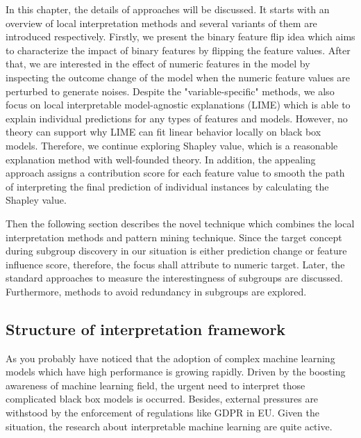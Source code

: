 In this chapter, the details of approaches will be discussed. It starts with an overview of local interpretation methods and several variants of them are introduced respectively. Firstly, we present the binary feature flip idea which aims to characterize the impact of binary features by flipping the feature values. After that, we are interested in the effect of numeric features in the model by inspecting the outcome change of the model when the numeric feature values are perturbed to generate noises. Despite the "variable-specific" methods, we also focus on local interpretable model-agnostic explanations (LIME) which is able to explain individual predictions for any types of features and models. However, no theory can support why LIME can fit linear behavior locally on black box models. Therefore, we continue exploring Shapley value, which is a reasonable explanation method with well-founded theory. In addition, the appealing approach assigns a contribution score for each feature value to smooth the path of interpreting the final prediction of individual instances by calculating the Shapley value. 

Then the following section describes the novel technique which combines the local interpretation methods and pattern mining technique. Since the target concept during subgroup discovery in our situation is either prediction change or feature influence score, therefore, the focus shall attribute to numeric target. Later, the standard approaches to measure the interestingness of subgroups are discussed. Furthermore, methods to avoid redundancy in subgroups are explored. 

\subsection{Structure of interpretation framework}

As you probably have noticed that the adoption of complex machine learning models which have high performance is growing rapidly. Driven by the boosting awareness of machine learning field, the urgent need to interpret those complicated black box models is occurred. Besides, external pressures are withstood by the enforcement of regulations like GDPR in EU. Given the situation, the research about interpretable machine learning are quite active. 

